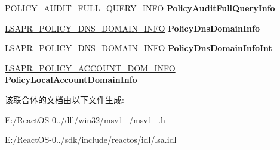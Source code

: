 \begin{DoxyCompactItemize}
\item 
\mbox{\label{union___l_s_a_p_r___p_o_l_i_c_y___i_n_f_o_r_m_a_t_i_o_n_ab020b453586d2712332f254ae730fc90}} 
\hyperlink{struct___p_o_l_i_c_y___a_u_d_i_t___f_u_l_l___q_u_e_r_y___i_n_f_o}{P\+O\+L\+I\+C\+Y\+\_\+\+A\+U\+D\+I\+T\+\_\+\+F\+U\+L\+L\+\_\+\+Q\+U\+E\+R\+Y\+\_\+\+I\+N\+FO} {\bfseries Policy\+Audit\+Full\+Query\+Info}
\item 
\mbox{\label{union___l_s_a_p_r___p_o_l_i_c_y___i_n_f_o_r_m_a_t_i_o_n_a940bddee95a56e2c16ff9a8df9ba46ec}} 
\hyperlink{struct___l_s_a_p_r___p_o_l_i_c_y___d_n_s___d_o_m_a_i_n___i_n_f_o}{L\+S\+A\+P\+R\+\_\+\+P\+O\+L\+I\+C\+Y\+\_\+\+D\+N\+S\+\_\+\+D\+O\+M\+A\+I\+N\+\_\+\+I\+N\+FO} {\bfseries Policy\+Dns\+Domain\+Info}
\item 
\mbox{\label{union___l_s_a_p_r___p_o_l_i_c_y___i_n_f_o_r_m_a_t_i_o_n_a3a568cef2c1519cdf962377fcb309cb4}} 
\hyperlink{struct___l_s_a_p_r___p_o_l_i_c_y___d_n_s___d_o_m_a_i_n___i_n_f_o}{L\+S\+A\+P\+R\+\_\+\+P\+O\+L\+I\+C\+Y\+\_\+\+D\+N\+S\+\_\+\+D\+O\+M\+A\+I\+N\+\_\+\+I\+N\+FO} {\bfseries Policy\+Dns\+Domain\+Info\+Int}
\item 
\mbox{\label{union___l_s_a_p_r___p_o_l_i_c_y___i_n_f_o_r_m_a_t_i_o_n_a0d3a5881d32bfbbdca19f2fc002d3c53}} 
\hyperlink{struct___l_s_a_p_r___p_o_l_i_c_y___a_c_c_o_u_n_t___d_o_m___i_n_f_o}{L\+S\+A\+P\+R\+\_\+\+P\+O\+L\+I\+C\+Y\+\_\+\+A\+C\+C\+O\+U\+N\+T\+\_\+\+D\+O\+M\+\_\+\+I\+N\+FO} {\bfseries Policy\+Local\+Account\+Domain\+Info}
\end{DoxyCompactItemize}


该联合体的文档由以下文件生成\+:\begin{DoxyCompactItemize}
\item 
E\+:/\+React\+O\+S-\/0../dll/win32/msv1\+\_/msv1\+\_.\+h\item 
E\+:/\+React\+O\+S-\/0../sdk/include/reactos/idl/lsa.\+idl\end{DoxyCompactItemize}
